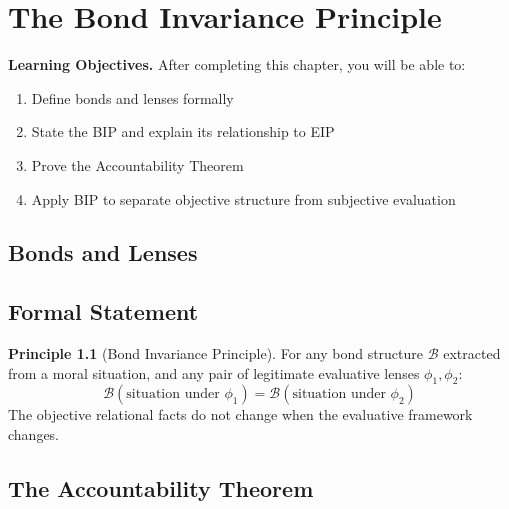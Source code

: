 \documentclass[12pt,letterpaper,twoside,openright]{book}
\theoremstyle{plain}
\theoremstyle{definition}
\newtheorem{principle}[theorem]{Principle}
\theoremstyle{remark}
\newcommand{\calB}{\mathcal{B}}
\begin{document}
\chapter{The Bond Invariance Principle}
\label{ch:bip}

\begin{framed}
\noindent\textbf{Learning Objectives.} After completing this chapter, you will be able to:
\begin{enumerate}
    \item Define bonds and lenses formally
    \item State the BIP and explain its relationship to EIP
    \item Prove the Accountability Theorem
    \item Apply BIP to separate objective structure from subjective evaluation
\end{enumerate}
\end{framed}

\section{Bonds and Lenses}

\section{Formal Statement}
\begin{principle}[Bond Invariance Principle]
For any bond structure $\calB$ extracted from a moral situation, and any pair of legitimate evaluative lenses $\phi_1, \phi_2$:
\[
\calB(\text{situation under } \phi_1) = \calB(\text{situation under } \phi_2)
\]
The objective relational facts do not change when the evaluative framework changes.
\end{principle}

\section{The Accountability Theorem}
\end{document}
